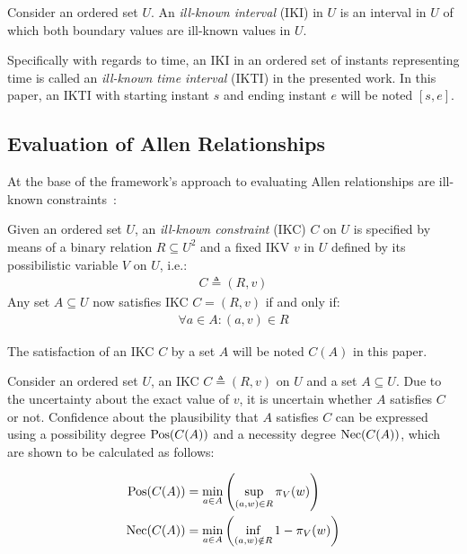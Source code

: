 \begin{definition}
Consider an ordered set $U$. An \emph{ill-known interval} (IKI) in $U$ is an interval in $U$ of which both boundary values are ill-known values in $U$.
\end{definition}

Specifically with regards to time, an IKI in an ordered set of instants representing time is called an \emph{ill-known time interval} (IKTI) in the presented work. In this paper, an IKTI with starting instant $s$ and ending instant $e$ will be noted $\left[s, e\right]$.

\subsection{\label{subsec:ikc-evaluation}Evaluation of Allen Relationships}
At the base of the framework's approach to evaluating Allen relationships are ill-known constraints~\cite{Pons2011}:

\begin{definition}
Given an ordered set $U$, an \emph{ill-known constraint} (IKC) $C$ on $U$ is specified by means of a binary relation $R \subseteq U^{2}$ and a fixed IKV $v$ in $U$ defined by its possibilistic variable $V$ on $U$, i.e.:
\begin{align}
C \triangleq (R,v) \nonumber
\end{align}
Any set $A \subseteq U$ now satisfies IKC $C = (R,v)$ if and only if:
\begin{align}
\forall a \in A : (a,v) \in R \nonumber
\end{align}
\end{definition}

The satisfaction of an IKC $C$ by a set $A$ will be noted $C(A)$ in this paper. 

Consider an ordered set $U$, an IKC $C \triangleq (R,v)$ on $U$ and a set $A \subseteq U$. Due to the uncertainty about the exact value of $v$, it is uncertain whether $A$ satisfies $C$ or not. Confidence about the plausibility that $A$ satisfies $C$ can be expressed using a possibility degree $\operatorname{Pos}(C(A))$ and a necessity degree $\operatorname{Nec}(C(A))$, which are shown to be calculated as follows:

\begin{align}
\operatorname{Pos}(C(A)) & = \min_{a \in A}\left(\sup_{(a,w) \in R}\pi_{V}(w)\right) \label{ill-known-pos}\\
\operatorname{Nec}(C(A)) & = \min_{a \in A}\left(\inf_{(a,w) \notin R} 1-\pi_{V}(w)\right) \label{ill-known-nec}
\end{align}

